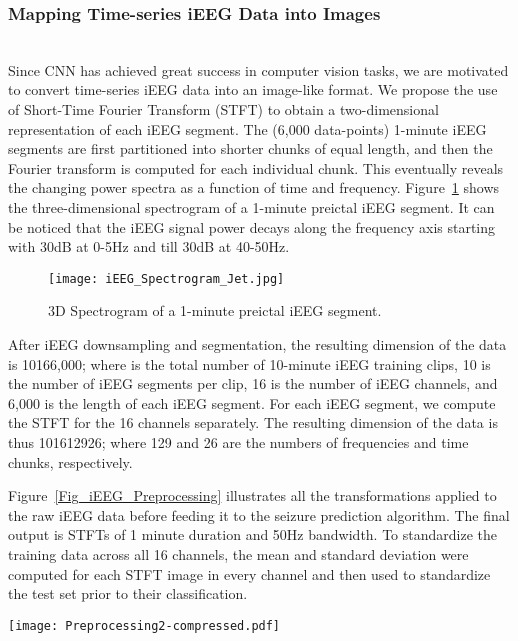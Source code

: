 \documentclass[journal]{IEEEtran}
\begin{document}
\subsubsection{Mapping Time-series iEEG Data into Images} ~\\
Since CNN has achieved great success in computer vision tasks, we are motivated to convert time-series iEEG data into an image-like format. We propose the use of Short-Time Fourier Transform (STFT) to obtain a two-dimensional representation of each iEEG segment. The (6,000 data-points) 1-minute iEEG segments are first partitioned into shorter chunks of equal length, and then the Fourier transform is computed for each individual chunk. This eventually reveals the changing power spectra as a function of time and frequency. Figure~\ref{Fig_Spectrogram_Jet} shows the three-dimensional spectrogram of a 1-minute preictal iEEG segment. It can be noticed that the iEEG signal power decays along the frequency axis starting with 30dB at 0-5Hz and till 30dB at 40-50Hz.       

\begin{figure}[!t]\centering
	\texttt{[image: iEEG\_Spectrogram\_Jet.jpg]}
	\caption{3D Spectrogram of a 1-minute preictal iEEG segment.}
	\label{Fig_Spectrogram_Jet}
\end{figure}

After iEEG downsampling and segmentation, the resulting dimension of the data is 10166,000; where  is the total number of 10-minute iEEG training clips, 10 is the number of iEEG segments per clip, 16 is the number of iEEG channels, and 6,000 is the length of each iEEG segment. For each iEEG segment, we compute the STFT for the 16 channels separately. The resulting dimension of the data is thus 101612926; where 129 and 26 are the numbers of frequencies and time chunks, respectively.

Figure~\ref{Fig_iEEG_Preprocessing} illustrates all the transformations applied to the raw iEEG data before feeding it to the seizure prediction algorithm. The final output is STFTs of 1 minute duration and 50Hz bandwidth. To standardize the training data across all 16 channels, the mean and standard deviation were computed for each STFT image in every channel and then used to standardize the test set prior to their classification. 

\begin{figure*}[!ht]
	\centering
	\texttt{[image: Preprocessing2-compressed.pdf]}
	\caption{Schematic pipeline of the proposed iEEG data pre-processing approach for epileptic seizure prediction: SEG1, SEG2, , SEG10 are corresponding to the , , and  iEEG segments of each iEEG channel signal;  is the total number of iEEG channels (=16),  is the number of segments per iEEG clip (=10), and  is the number of data-points in each iEEG segment (=6,000).}
	\label{Fig_iEEG_Preprocessing}
\end{figure*}
\end{document}

